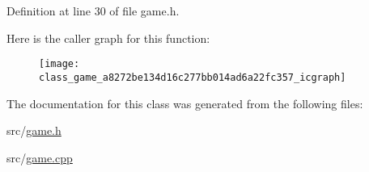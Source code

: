 Definition at line 30 of file game.\-h.



Here is the caller graph for this function\-:\nopagebreak
\begin{figure}[H]
\begin{center}
\leavevmode
\texttt{[image: class\_game\_a8272be134d16c277bb014ad6a22fc357\_icgraph]}
\end{center}
\end{figure}




The documentation for this class was generated from the following files\-:\begin{DoxyCompactItemize}
\item 
src/\hyperlink{game_8h}{game.\-h}\item 
src/\hyperlink{game_8cpp}{game.\-cpp}\end{DoxyCompactItemize}
